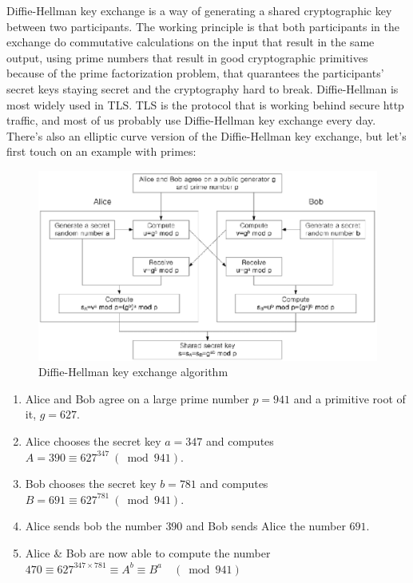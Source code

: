 Diffie-Hellman key exchange is a way of generating a shared cryptographic key between two participants. The working principle is that both participants in the exchange do commutative calculations on the input that result in the same output, using prime numbers that result in good cryptographic primitives because of the prime factorization problem, that quarantees the participants' secret keys staying secret and the cryptography hard to break. Diffie-Hellman is most widely used in TLS. TLS is the protocol that is working behind secure http traffic, and most of us probably use Diffie-Hellman key exchange every day. There's also an elliptic curve version of the Diffie-Hellman key exchange, but let's first touch on an example with primes:

\begin{figure}
	\includegraphics[width=\textwidth]{pictures/diffiehellman.eps}
	\caption{Diffie-Hellman key exchange algorithm\cite{Jeon2014-ag}}
	\label{Diagram, Diffie-Hellman Key Exchange}
\end{figure}

\begin{enumerate}
  \item Alice and Bob agree on a large prime number $p = 941$ and a primitive root of it, $g = 627$.
  \item Alice chooses the secret key $a = 347$ and computes
    \(A = 390 \equiv 627^{347} \ (\bmod 941).\)
  \item Bob chooses the secret key $b = 781$ and computes
    \(B = 691 \equiv 627^{781} \ (\bmod 941).\)
  \item Alice sends bob the number $390$ and Bob sends Alice the number $691$.
  \item Alice & Bob are now able to compute the number
    \(470 \equiv 627^{347 \times 781} \equiv A^b \equiv B^a \quad (\bmod 941)\)
\end{enumerate}

